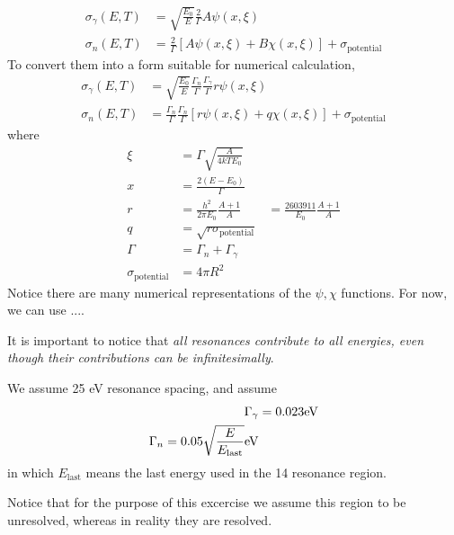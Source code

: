 \documentclass{school-22.211-notes}
\begin{document}
\begin{align}
\sigma_{\gamma} (E,T) &= \sqrt{\frac{E_0}{E}} \frac{2}{\Gamma} A \psi(x,\xi) \\
\sigma_{n} (E,T) &= \frac{2}{\Gamma} \left[ A \psi(x,\xi) + B \chi(x,\xi) \right] + \sigma_{\mathrm{potential}} 
\end{align}
To convert them into a form suitable for numerical calculation,
\begin{align}
\sigma_{\gamma} (E,T) &= \sqrt{\frac{E_0}{E}} \frac{\Gamma_n}{\Gamma} \frac{\Gamma_{\gamma}}{\Gamma} r \psi(x,\xi) \\
\sigma_{n} (E,T) &= \frac{\Gamma_n}{\Gamma} \frac{\Gamma_n}{\Gamma} \left[ r \psi(x,\xi) + q \chi(x,\xi) \right] + \sigma_{\mathrm{potential}} 
\end{align}
where
\begin{align}
\xi &= \Gamma \sqrt{\frac{A}{4 k T E_0}} \\
x &= \frac{2 (E-E_0)}{\Gamma} \\
r &= \frac{h^2}{2 \pi E_0} \frac{A+1}{A} &= \frac{2603911}{E_0} \frac{A+1}{A} \\
q &= \sqrt{ r \sigma_{\mathrm{potential}} } \\
\Gamma &= \Gamma_n + \Gamma_{\gamma} \\
\sigma_{\mathrm{potential}} &=  4 \pi R^2 
\end{align}
Notice there are many numerical representations of the $\psi, \chi$ functions. For now, we can use ....


It is important to notice that \textit{all resonances contribute to all energies, even though their contributions can be infinitesimally}. 

We assume 25 eV resonance spacing, and assume
\begin{align}
\Gamma_{\gamma} &= 0.023 \mathrm{eV} \\
\Gamma_{n} = 0.05 \sqrt{\frac{E}{E_{\mathrm{last}}}}  \mathrm{eV}
\end{align}
in which $E_{\mathrm{last}}$ means the last energy used in the 14 resonance region. 

Notice that for the purpose of this excercise we assume this region to be unresolved, whereas in reality they are resolved. 
\end{document}

